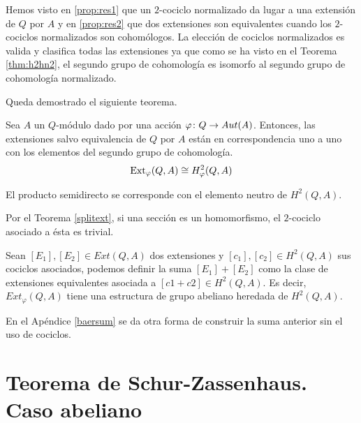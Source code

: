 Hemos visto en \ref{prop:res1} que un $2$-cociclo normalizado da lugar a una extensión de $Q$ por $A$ y en \ref{prop:res2} que dos extensiones son equivalentes cuando los $2$-cociclos normalizados son cohomólogos. La elección de cociclos normalizados es valida y clasifica todas las extensiones ya que como se ha visto en el Teorema \ref{thm:h2hn2}, el segundo grupo de cohomología es isomorfo al segundo grupo de cohomología normalizado. %

Queda demostrado el siguiente teorema. %

\begin{teorema}\label{h2}
	Sea $A$ un $Q$-módulo dado por una acción $\varphi\colon Q\to Aut(A)$. Entonces, las extensiones salvo equivalencia de $Q$ por $A$ están en correspondencia uno a uno con los elementos del segundo grupo de cohomología.
	\begin{equation*}
		\operatorname{Ext}_{\varphi}(Q,A)\cong H^2_{\varphi}(Q,A)
	\end{equation*}
\end{teorema}

\begin{observacion}\label{obs:split}
	El producto semidirecto se corresponde con el elemento neutro de $H^2(Q,A)$.
	\begin{demostracion}
		Por el Teorema \ref{splitext}, si una sección es un homomorfismo, el $2$-cociclo asociado a ésta es trivial.
	\end{demostracion}
\end{observacion}

\begin{proposicion}\label{extsum}
	Sean $[E_1],[E_2]\in Ext(Q,A)$ dos extensiones y $[c_1],[c_2]\in H^2(Q,A)$ sus cociclos asociados, podemos definir la suma $[E_1] + [E_2]$ como la clase de extensiones equivalentes asociada a $[c1+c2]\in H^2(Q,A)$. Es decir, $Ext_\varphi(Q,A)$ tiene una estructura de grupo abeliano heredada de $H^2(Q,A)$.
\end{proposicion}

En el Apéndice \ref{baersum} se da otra forma de construir la suma anterior sin el uso de cociclos.

\section{Teorema de Schur-Zassenhaus. Caso abeliano}


